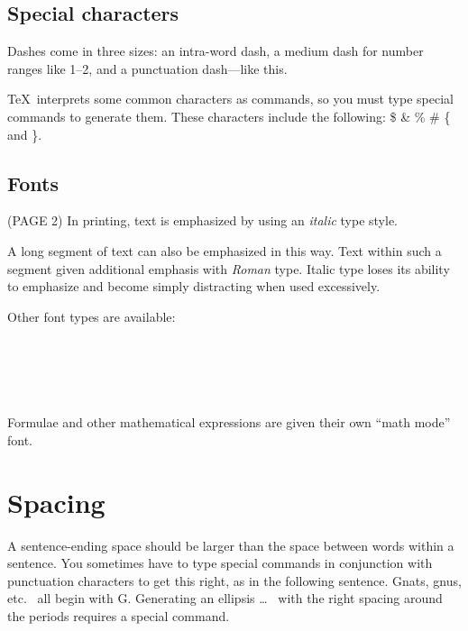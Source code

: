 \documentclass[12pt]{article}
\begin{document}
\subsection{Special characters}
Dashes come in three sizes: an
       intra-word
dash, a medium dash for number ranges like
       1--2,
and a punctuation
       dash---like
this.

\TeX\ interprets some common characters as commands, so you must type
special commands to generate them.  These characters include the
following: \$ \& \% \# \{ and \}.

\subsection{Fonts}		(PAGE 2)
In printing, text is emphasized by using an {\em italic\/}
type style.     %
\begin{em}
   A long segment of text can also be emphasized in this way.  Text within
   such a segment given additional emphasis
          with\/ {\em Roman}
   type.  Italic type loses its ability to emphasize and become simply
   distracting when used excessively.
\end{em}

Other font types are available:    \\
	\\
	\\
	\\
	\\
	\\
Formulae and other mathematical expressions are given
their own ``math mode'' font.

\section{Spacing}
A sentence-ending space should be larger than the space between words
within a sentence.  You sometimes have to type special commands in
conjunction with punctuation characters to get this right, as in the
following sentence.
       Gnats, gnus, etc.\    %
       all begin with G\@.   %
Generating an ellipsis
  \ldots\	%
with the right spacing around the periods requires a special  command.
\end{document}
